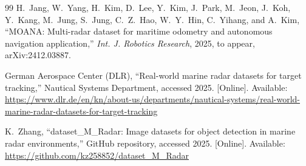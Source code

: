\documentclass[twocolumn, 10pt]{article}
\begin{document}
\begin{thebibliography}{99}
H.~Jang, W.~Yang, H.~Kim, D.~Lee, Y.~Kim, J.~Park, M.~Jeon, J.~Koh, Y.~Kang, M.~Jung, S.~Jung, C.~Z.~Hao, W.~Y.~Hin, C.~Yihang, and A.~Kim, ``MOANA: Multi-radar dataset for maritime odometry and autonomous navigation application,'' \emph{Int. J. Robotics Research}, 2025, to appear, arXiv:2412.03887.

German Aerospace Center (DLR), ``Real-world marine radar datasets for target tracking,'' Nautical Systems Department, accessed 2025. [Online]. Available: \url{https://www.dlr.de/en/kn/about-us/departments/nautical-systems/real-world-marine-radar-datasets-for-target-tracking}

K.~Zhang, ``dataset\_M\_Radar: Image datasets for object detection in marine radar environments,'' GitHub repository, accessed 2025. [Online]. Available: \url{https://github.com/kz258852/dataset_M_Radar}

\end{thebibliography}
\end{document}
